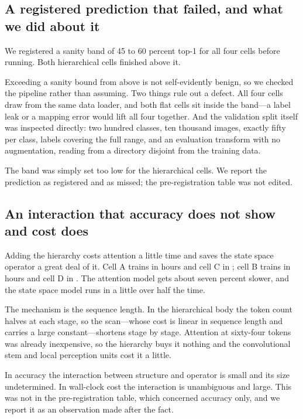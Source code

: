 \subsection{A registered prediction that failed, and what we did about it}

We registered a sanity band of 45 to 60 percent top-1 for all four cells
before running. Both hierarchical cells finished above it.

Exceeding a sanity bound from above is not self-evidently benign, so we
checked the pipeline rather than assuming. Two things rule out a defect.
All four cells draw from the same data loader, and both flat cells sit
inside the band---a label leak or a mapping error would lift all four
together. And the validation split itself was inspected directly: two
hundred classes, ten thousand images, exactly fifty per class, labels
covering the full range, and an evaluation transform with no augmentation,
reading from a directory disjoint from the training data.

The band was simply set too low for the hierarchical cells. We report the
prediction as registered and as missed; the pre-registration table was not
edited.

\subsection{An interaction that accuracy does not show and cost does}

Adding the hierarchy costs attention a little time and saves the state space
operator a great deal of it. Cell A trains in \HoursA{} hours and cell C in
\HoursC{}; cell B trains in \HoursB{} hours and cell D in \HoursD{}. The
attention model gets about seven percent slower, and the state space model
runs in a little over half the time.

The mechanism is the sequence length. In the hierarchical body the token
count halves at each stage, so the scan---whose cost is linear in sequence
length and carries a large constant---shortens stage by stage. Attention at
sixty-four tokens was already inexpensive, so the hierarchy buys it nothing
and the convolutional stem and local perception units cost it a little.

In accuracy the interaction between structure and operator is small and its
size undetermined. In wall-clock cost the interaction is unambiguous and
large. This was not in the pre-registration table, which concerned accuracy
only, and we report it as an observation made after the fact.

